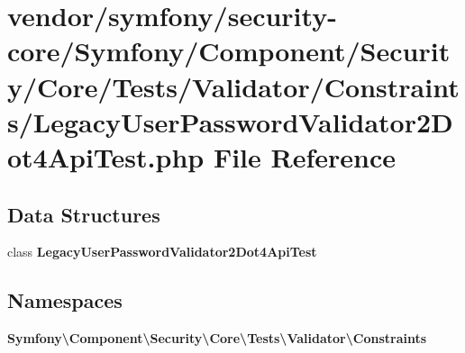 \section{vendor/symfony/security-\/core/\+Symfony/\+Component/\+Security/\+Core/\+Tests/\+Validator/\+Constraints/\+Legacy\+User\+Password\+Validator2\+Dot4\+Api\+Test.php File Reference}
\label{_legacy_user_password_validator2_dot4_api_test_8php}
\subsection*{Data Structures}
\begin{DoxyCompactItemize}
\item 
class {\bf Legacy\+User\+Password\+Validator2\+Dot4\+Api\+Test}
\end{DoxyCompactItemize}
\subsection*{Namespaces}
\begin{DoxyCompactItemize}
\item 
 {\bf Symfony\textbackslash{}\+Component\textbackslash{}\+Security\textbackslash{}\+Core\textbackslash{}\+Tests\textbackslash{}\+Validator\textbackslash{}\+Constraints}
\end{DoxyCompactItemize}
